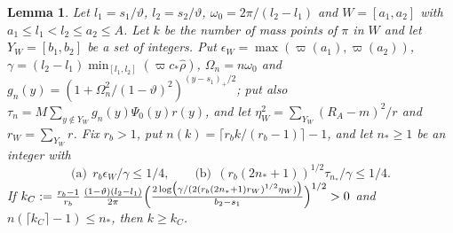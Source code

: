 \documentclass[10pt,letterpaper]{article}
\newtheorem{lemma}[theorem]{Lemma}
\begin{document}
\begin{lemma}\label{lem:C-count}
Let $l_1=s_1/\vartheta$, $l_2=s_2/\vartheta$, $\omega_0=2\pi/(l_2-l_1)$ and $W=[a_1,a_2]$ with $a_1\le l_1<l_2\le a_2\le A$. Let $k$ be the number of mass points of $\pi$ in $W$ and let $Y_W=[b_1,b_2]$ be a set of integers. Put $\epsilon_W=\max(\varpi(a_1),\varpi(a_2))$,
$\gamma=(l_2-l_1)\min_{[l_1,l_2]}(\varpi c_*\hat\rho)$, $\Omega_n=n\omega_0$ and $g_n(y)=(1+\Omega_n^2/(1-\vartheta)^2)^{(y-s_1)_+/2}$; put also $\tau_n=M\sum_{y\notin Y_W}g_n(y)\Psi_0(y)r(y)$, and let $\eta_W^2=\sum_{Y_W}(R_A-m)^2/r$ and $r_W=\sum_{Y_W}r$. Fix $r_b>1$, put
$n(k)=\lceil r_bk/(r_b-1)\rceil-1$, and let $n_*\ge1$ be an integer with
\[
\text{(a)}\ \ r_b\epsilon_W/\gamma\le1/4,\qquad\text{(b)}\ \ (r_b(2n_*+1))^{1/2}\tau_{n_*}/\gamma\le1/4 .
\]
If
$k_C:=\frac{r_b-1}{r_b}\,\frac{(1-\vartheta)(l_2-l_1)}{2\pi}\Bigl(\frac{2\log\bigl(\gamma/(2(r_b(2n_*+1)r_W)^{1/2}\eta_W)\bigr)}{b_2-s_1}\Bigr)^{1/2}>0$
and $n(\lceil k_C\rceil-1)\le n_*$, then $k\ge k_C$.
\end{lemma}
\end{document}
